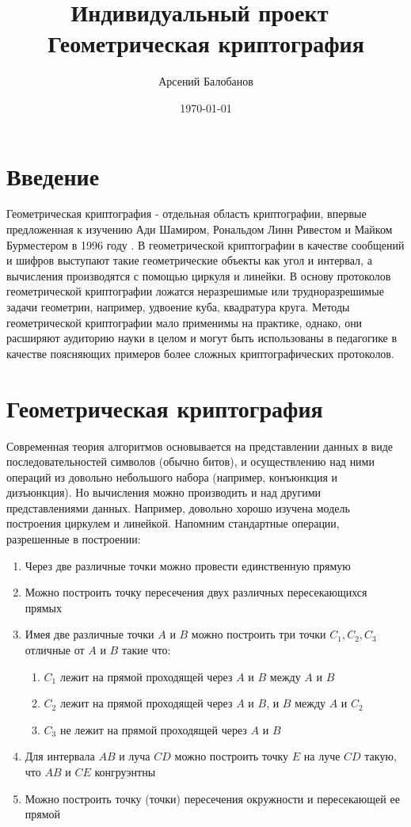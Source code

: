 \documentclass{report}%
\begin{document}
\frenchspacing
\setcounter{secnumdepth}{-1}
\title{Индивидуальный проект~\\Геометрическая криптография}
\author{Арсений Балобанов}
\date{\today}
\maketitle


\section{Введение}

Геометрическая криптография - отдельная область криптографии, впервые предложенная к изучению
Ади Шамиром, Рональдом Линн Ривестом и Майком Бурместером в 1996 году \cite{trisect}.
В геометрической криптографии в качестве сообщений и шифров выступают
такие геометрические объекты как угол и интервал, а
вычисления производятся с помощью циркуля и линейки. В основу протоколов геометрической
криптографии ложатся неразрешимые или трудноразрешимые задачи геометрии, например, удвоение куба,
квадратура круга. Методы геометрической криптографии мало применимы на практике, однако, они
расширяют аудиторию науки в целом и могут быть использованы в педагогике
в качестве поясняющих примеров более сложных криптографических протоколов.

\section{Геометрическая криптография}

Современная теория алгоритмов основывается на представлении данных
в виде последовательностей символов (обычно битов), и осуществлению над ними операций
из довольно небольшого набора (например, конъюнкция и дизъюнкция).
Но вычисления можно производить и над другими представлениями данных. Например, довольно хорошо
изучена модель построения циркулем и линейкой. Напомним стандартные операции, разрешенные в
построении:
\begin{enumerate}
	\item Через две различные точки можно провести единственную прямую
	\item Можно построить точку пересечения двух различных пересекающихся прямых
	\item Имея две различные точки $A$ и $B$ можно построить три точки $C_1, C_2, C_3$
		отличные от $A$ и $B$ такие что:
		\begin{enumerate}
			\item $C_1$ лежит на прямой проходящей через $A$ и $B$ между $A$ и $B$
			\item $C_2$ лежит на прямой проходящей через $A$ и $B$, и $B$ между $A$ и $C_2$
			\item $C_3$ не лежит на прямой проходящей через $A$ и $B$
		\end{enumerate}
	\item Для интервала $AB$ и луча $CD$ можно построить точку $E$ на луче $CD$ такую, что
		$AB$ и $CE$ конгруэнтны
	\item Можно построить точку (точки) пересечения окружности и пересекающей ее прямой
\end{enumerate}
\end{document}
